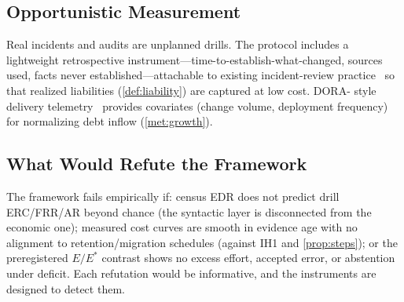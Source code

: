 \subsection{Opportunistic Measurement}
Real incidents and audits are unplanned drills. The protocol includes a lightweight
retrospective instrument---time-to-establish-what-changed, sources used, facts
never established---attachable to existing incident-review practice~\cite{beyer2016}
so that realized liabilities (\cref{def:liability}) are captured at low cost. DORA-%
style delivery telemetry~\cite{forsgren2018,dora2019} provides covariates
(change volume, deployment frequency) for normalizing debt inflow
(\cref{met:growth}).

\subsection{What Would Refute the Framework}
The framework fails empirically if: census EDR does not predict drill ERC/FRR/AR beyond
chance (the syntactic layer is disconnected from the economic one); measured cost
curves are smooth in evidence age with no alignment to retention/migration
schedules (against IH1 and \cref{prop:steps}); or the preregistered $E/E^{*}$
contrast shows no excess effort, accepted error, or abstention under deficit. Each
refutation would be informative, and the instruments are designed to detect them.
